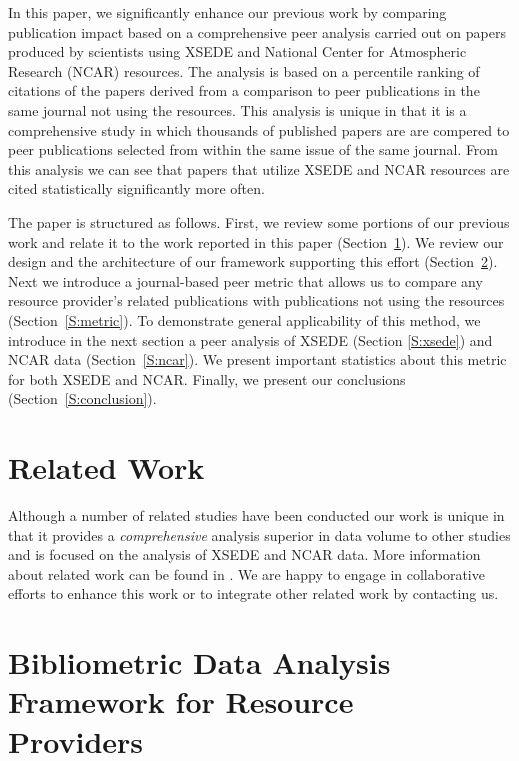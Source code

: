 \documentclass{sig-alternate}
\begin{document}
In this paper, we significantly enhance our previous work by comparing publication impact based on a comprehensive peer analysis carried out on papers produced by scientists using XSEDE and National Center for Atmospheric Research (NCAR) resources. The analysis is based on a percentile ranking of citations of the papers derived from a comparison to peer publications in the same journal not using the resources.  This analysis is unique in that it is a comprehensive study in which thousands of published papers are are compered to peer publications selected from within the same issue of the same journal. From this analysis we can see that papers that utilize XSEDE and NCAR resources are cited statistically significantly more often.  

The paper is structured as follows. First, we review some portions of our previous work and relate it to the work reported in this paper (Section~\ref{S:related}). We review our design and the architecture of our framework supporting this effort (Section~\ref{S:framework}). Next we introduce a journal-based peer metric that allows us to compare any resource provider's related publications with publications not using the resources (Section~\ref{S:metric}).  To demonstrate general applicability of this method, we introduce in the next section a peer analysis of XSEDE (Section \ref{S:xsede}) and NCAR data (Section~\ref{S:ncar}). We present important statistics about this metric for both XSEDE and NCAR. Finally, we present our conclusions (Section~\ref{S:conclusion}).

\section{Related Work} \label{S:related}

Although a number of related studies have been conducted
\cite{thomas1998institutional,
  Bollen:2007:MUM:1255175.1255273,Bollen:2008:TUI:1378889.1378928,
  bollen2009principal,bollen2011and} our work is unique in that it provides a {\em comprehensive} analysis superior in data volume to other studies and is focused on the analysis of XSEDE and NCAR data. More information about related work can be found in \cite{las14impact}. We are happy to engage in collaborative efforts to enhance this work or to integrate other related work by contacting us.

\section{Bibliometric Data Analysis \\Framework for Resource
  \\Providers} \label{S:framework}
\end{document}
